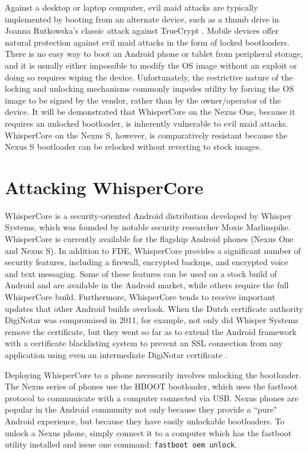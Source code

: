 Against a desktop or laptop computer, evil maid attacks are typically implemented by booting from an alternate device, such as a
thumb drive in Joanna Rutkowska's classic attack against TrueCrypt \cite{evilmaid}.  Mobile devices offer natural protection against evil
maid attacks in the form of locked bootloaders.  There is no easy way to boot an Android phone or tablet from peripheral storage,
and it is usually either impossible to modify the OS image without an exploit or doing so requires wiping the device.
Unfortunately, the restrictive nature of the locking and unlocking mechanisms commonly impedes utility by forcing the OS image to be
signed by the vendor, rather than by the owner/operator of the device. It will be demonstrated that WhisperCore on the Nexus One,
because it requires an unlocked bootloader, is inherently vulnerable to evil maid attacks.  WhisperCore on the Nexus S, however, is
comparatively resistant because the Nexus S bootloader can be relocked without reverting to stock images.  

\section{Attacking WhisperCore}
WhisperCore is a security-oriented Android distribution developed by Whisper Systems, which was founded by notable security
researcher Moxie Marlinspike.  WhisperCore is currently available for the flagship Android phones (Nexus One and Nexus S). In
addition to FDE, WhisperCore provides a significant number of security features, including a firewall, encrypted backups, and
encrypted voice and text messaging.  Some of these features can be used on a stock build of Android and are available in the Android
market, while others require the full WhisperCore build.  Furthermore, WhisperCore tends to receive important updates that other
Android builds overlook. When the Dutch certificate authority DigiNotar was compromised in 2011, for example, not only did Whisper
Systems remove the certificate, but they went so far as to extend the Android framework with a certificate blacklisting system to
prevent an SSL connection from any application using even an intermediate DigiNotar certificate \cite{whispernotar}. 

Deploying WhisperCore to a phone necessarily involves unlocking the bootloader.  The Nexus series of phones use the HBOOT
bootloader, which uses the fastboot protocol to communicate with a computer connected via USB.  Nexus phones are popular in the
Android community not only because they provide a ``pure" Android experience, but because they have easily unlockable bootloaders.
To unlock a Nexus phone, simply connect it to a computer which has the fastboot utility installed and issue one command:
\texttt{fastboot oem unlock}.

